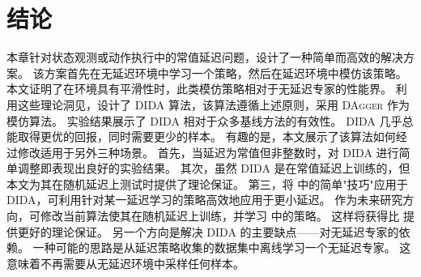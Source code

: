\section{结论}
本章针对状态观测或动作执行中的常值延迟问题，设计了一种简单而高效的解决方案。
该方案首先在无延迟环境中学习一个策略，然后在延迟环境中模仿该策略。
本文证明了在环境具有平滑性时，此类模仿策略相对于无延迟专家的性能界。
利用这些理论洞见，设计了 DIDA 算法，该算法遵循上述原则，采用 \textsc{DAgger} 作为模仿算法。
实验结果展示了 DIDA 相对于众多基线方法的有效性。
DIDA 几乎总能取得更优的回报，同时需要更少的样本。
有趣的是，本文展示了该算法如何经过修改适用于另外三种场景。
首先，当延迟为常值但非整数时，对 DIDA 进行简单调整即表现出良好的实验结果。
其次，虽然 DIDA 是在常值延迟上训练的，但本文为其在随机延迟上测试时提供了理论保证。
第三，将 中的简单"技巧"应用于 DIDA，可利用针对某一延迟学习的策略高效地应用于更小延迟。
作为未来研究方向，可修改当前算法使其在随机延迟上训练，并学习 中的策略。
这样将获得比 提供更好的理论保证。
另一个方向是解决 DIDA 的主要缺点——对无延迟专家的依赖。
一种可能的思路是从延迟策略收集的数据集中离线学习一个无延迟专家。
这意味着不再需要从无延迟环境中采样任何样本。

